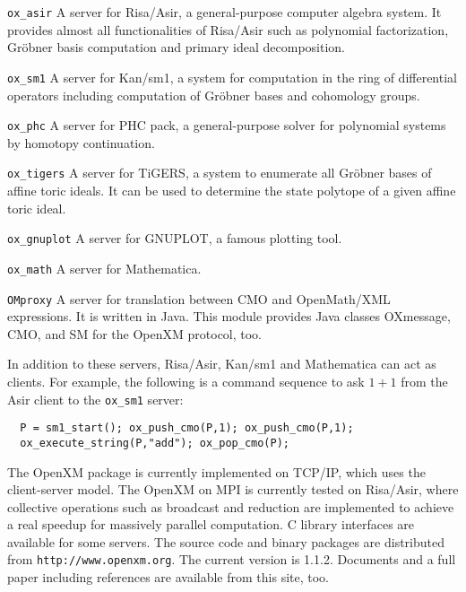 \documentclass[notitlepage]{book}
\begin{document}
\begin{description}
\item{\tt ox\_asir}
A server for Risa/Asir, a general-purpose computer algebra
system. It provides almost
all functionalities of Risa/Asir such as polynomial factorization,
Gr\"obner basis computation and primary ideal decomposition.
\item{\tt ox\_sm1}
A server for Kan/sm1, a system for computation in 
the ring of differential operators including computation of Gr\"obner bases
and cohomology groups.
\item {\tt ox\_phc}
A server for PHC pack, a general-purpose solver for
polynomial systems by homotopy continuation. 
\item {\tt ox\_tigers}
A server for TiGERS, a system to enumerate
all Gr\"obner bases of affine toric ideals.
It can be used to determine the state polytope
of a given affine toric ideal.
\item {\tt ox\_gnuplot}
A server for GNUPLOT, a famous plotting tool.
\item {\tt ox\_math}
A server for Mathematica.
\item {\tt OMproxy}
A server for translation between CMO and OpenMath/XML expressions.
It is written in Java.
This module provides Java classes OXmessage, CMO, and SM
for the OpenXM protocol, too.
\end{description}
In addition to these servers, Risa/Asir, Kan/sm1 and Mathematica
can act as clients. 
For example, the following is a command sequence to ask $1+1$ from
the Asir client to the {\tt ox\_sm1} server:
\begin{verbatim}
  P = sm1_start(); ox_push_cmo(P,1); ox_push_cmo(P,1);
  ox_execute_string(P,"add"); ox_pop_cmo(P);
\end{verbatim}
The OpenXM package is currently implemented on TCP/IP, 
which uses the client-server model.
The OpenXM on MPI is currently tested on Risa/Asir,
where collective operations such as broadcast and reduction
are implemented to achieve a real speedup for massively parallel computation.
C library interfaces are available for some servers.
The source code and binary packages are distributed from
{\tt http://www.openxm.org}.
The current version is 1.1.2.
Documents and a full paper including references are available
from this site, too.
\end{document}
